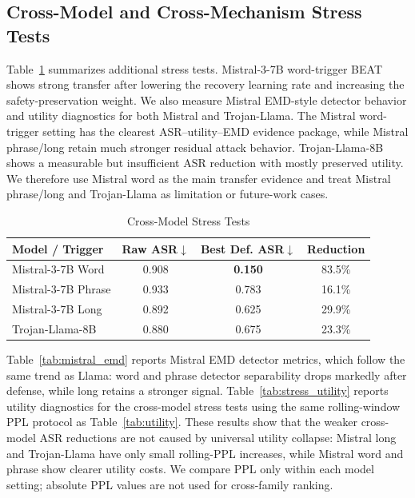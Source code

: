 \documentclass[lettersize,journal]{IEEEtran}
\begin{document}
\subsection{Cross-Model and Cross-Mechanism Stress Tests}
Table~\ref{tab:cross_model} summarizes additional stress tests. Mistral-3-7B word-trigger BEAT shows strong transfer after lowering the recovery learning rate and increasing the safety-preservation weight. We also measure Mistral EMD-style detector behavior and utility diagnostics for both Mistral and Trojan-Llama. The Mistral word-trigger setting has the clearest ASR--utility--EMD evidence package, while Mistral phrase/long retain much stronger residual attack behavior. Trojan-Llama-8B shows a measurable but insufficient ASR reduction with mostly preserved utility. We therefore use Mistral word as the main transfer evidence and treat Mistral phrase/long and Trojan-Llama as limitation or future-work cases.

\begin{table}[!t]
\caption{Cross-Model Stress Tests}
\label{tab:cross_model}
\centering
\begin{tabular}{lccc}
\toprule
Model / Trigger & Raw ASR$\downarrow$ & Best Def. ASR$\downarrow$ & Reduction \\
\midrule
Mistral-3-7B Word & 0.908 & \textbf{0.150} & 83.5\% \\
Mistral-3-7B Phrase & 0.933 & 0.783 & 16.1\% \\
Mistral-3-7B Long & 0.892 & 0.625 & 29.9\% \\
Trojan-Llama-8B & 0.880 & 0.675 & 23.3\% \\
\bottomrule
\end{tabular}
\end{table}

Table~\ref{tab:mistral_emd} reports Mistral EMD detector metrics, which follow the same trend as Llama: word and phrase detector separability drops markedly after defense, while long retains a stronger signal. Table~\ref{tab:stress_utility} reports utility diagnostics for the cross-model stress tests using the same rolling-window PPL protocol as Table~\ref{tab:utility}. These results show that the weaker cross-model ASR reductions are not caused by universal utility collapse: Mistral long and Trojan-Llama have only small rolling-PPL increases, while Mistral word and phrase show clearer utility costs. We compare PPL only within each model setting; absolute PPL values are not used for cross-family ranking.
\end{document}
